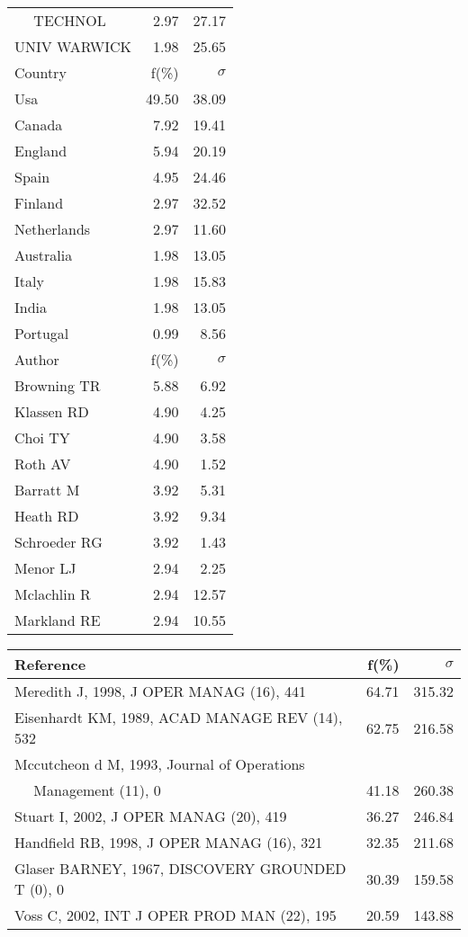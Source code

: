 \documentclass[a4paper,11pt]{report}
\begin{document}
\begin{landscape}
\begin{table}[!ht]
{\begin{tabular}{|l r r|}
$\quad$ TECHNOL & 2.97 & 27.17\\
UNIV WARWICK & 1.98 & 25.65\\
\hline
\hline
Country & f(\%) & $\sigma$\\
\hline
Usa & 49.50 & 38.09\\
Canada & 7.92 & 19.41\\
England & 5.94 & 20.19\\
Spain & 4.95 & 24.46\\
Finland & 2.97 & 32.52\\
Netherlands & 2.97 & 11.60\\
Australia & 1.98 & 13.05\\
Italy & 1.98 & 15.83\\
India & 1.98 & 13.05\\
Portugal & 0.99 & 8.56\\
\hline
\hline
Author & f(\%) & $\sigma$\\
\hline
Browning TR & 5.88 & 6.92\\
Klassen RD & 4.90 & 4.25\\
Choi TY & 4.90 & 3.58\\
Roth AV & 4.90 & 1.52\\
Barratt M & 3.92 & 5.31\\
Heath RD & 3.92 & 9.34\\
Schroeder RG & 3.92 & 1.43\\
Menor LJ & 2.94 & 2.25\\
Mclachlin R & 2.94 & 12.57\\
Markland RE & 2.94 & 10.55\\
\hline
\end{tabular}
}
{\scriptsize\begin{tabular}{|l r r|}
\hline
Reference & f(\%) & $\sigma$\\
\hline
Meredith J, 1998, J OPER MANAG (16), 441 & 64.71 & 315.32\\
Eisenhardt KM, 1989, ACAD MANAGE REV (14), 532 & 62.75 & 216.58\\
Mccutcheon d M, 1993, Journal of Operations &  & \\
$\quad$ Management (11), 0 & 41.18 & 260.38\\
Stuart I, 2002, J OPER MANAG (20), 419 & 36.27 & 246.84\\
Handfield RB, 1998, J OPER MANAG (16), 321 & 32.35 & 211.68\\
Glaser BARNEY, 1967, DISCOVERY GROUNDED T (0), 0 & 30.39 & 159.58\\
Voss C, 2002, INT J OPER PROD MAN (22), 195 & 20.59 & 143.88\\

\end{tabular}}
\end{table}
\end{landscape}
\end{document}
